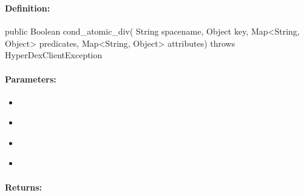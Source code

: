 \subsubsection{}
\label{api:java:cond_atomic_div}


\paragraph{Definition:}
\begin{javacode}
public Boolean cond_atomic_div(
        String spacename,
        Object key,
        Map<String, Object> predicates,
        Map<String, Object> attributes) throws HyperDexClientException
\end{javacode}

\paragraph{Parameters:}
\begin{itemize}[noitemsep]
\item {}\\

\item {}\\

\item {}\\

\item {}\\

\end{itemize}

\paragraph{Returns:}


\pagebreak
\subsubsection{}
\label{api:java:async_cond_atomic_div}


